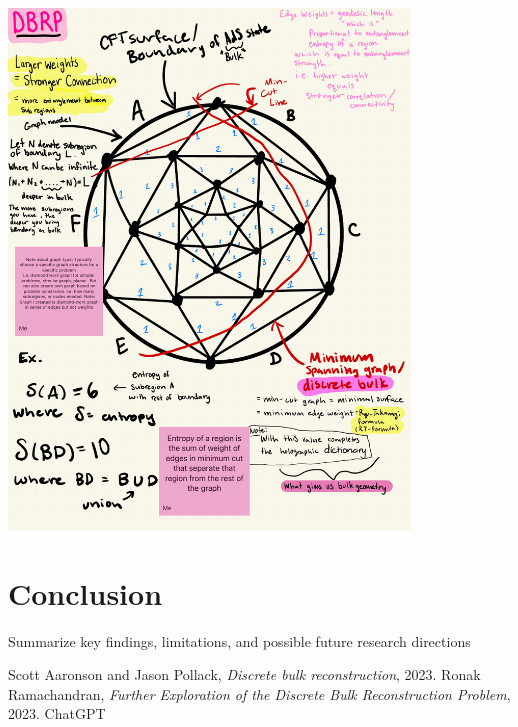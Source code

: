 \documentclass[12pt]{article}
\begin{document}
\newpage

\begin{center}
    \includegraphics[width=0.8\textwidth]{dbrp_summed.pdf}
\end{center}

\section{Conclusion}
Summarize key findings, limitations, and possible future research directions

\newpage

\begin{thebibliography}{9}
    Scott Aaronson and Jason Pollack, \textit{Discrete bulk reconstruction}, 2023.
    Ronak Ramachandran, \textit{Further Exploration of the Discrete Bulk Reconstruction Problem}, 2023.
    ChatGPT
\end{thebibliography}
\end{document}
